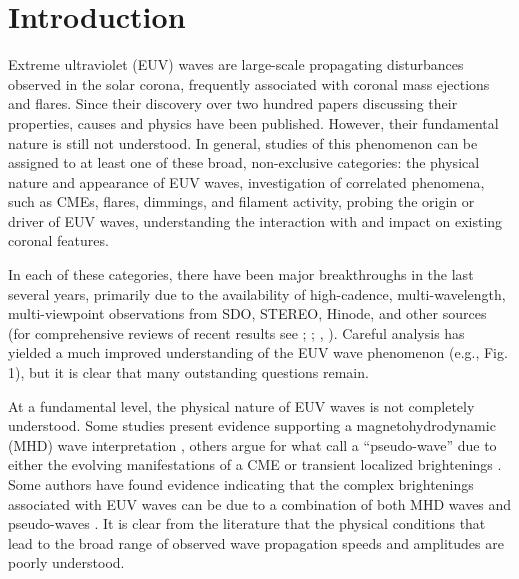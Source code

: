 \section{Introduction}\label{sec:Intro}

Extreme ultraviolet (EUV) waves are large-scale propagating
disturbances observed in the solar corona, frequently associated with
coronal mass ejections and flares.  Since their discovery
\citep{1997SoPh..175..571M, 1998GeoRL..25.2465T, 1999ApJ...517L.151T}
over two hundred papers discussing their properties, causes and
physics have been published.  However, their fundamental nature is
still not understood. In general, studies of this phenomenon can be
assigned to at least one of these broad, non-exclusive categories: the
physical nature and appearance of EUV waves, investigation of
correlated phenomena, such as CMEs, flares, dimmings, and filament
activity, probing the origin or driver of EUV waves, understanding the
interaction with and impact on existing coronal features.

In each of these categories, there have been major breakthroughs in
the last several years, primarily due to the availability of
high-cadence, multi-wavelength, multi-viewpoint observations from SDO,
STEREO, Hinode, and other sources (for comprehensive reviews of recent
results see \cite{2011SSRv..158..365G}; \cite{2011JASTP..73.1096Z};
\cite{2011A&A...532A.151W}, \cite{2012SoPh..281..187P}).  Careful
analysis has yielded a much improved understanding of the EUV wave
phenomenon (e.g., Fig. 1), but it is clear that many outstanding
questions remain.

At a fundamental level, the physical nature of EUV waves is not
completely understood. Some studies present evidence supporting a
magnetohydrodynamic (MHD) wave interpretation
\citep{1998GeoRL..25.2465T, 1999ApJ...517L.151T,2000ApJ...543L..89W,
  2001JGR...10625089W, 2002ApJ...574..440O, 2010ApJ...713.1008S},
others argue for what \cite{2012SoPh..281..187P} call a “pseudo-wave”
due to either the evolving manifestations of a CME
\citep{1999SoPh..190..107D, 2000ApJ...545..512D, 2008SoPh..247..123D,
  2011ApJ...738..167S} or transient localized brightenings
\citep{2007AN....328..760A, 2007ApJ...656L.101A,}.  Some authors have
found evidence indicating that the complex brightenings associated
with EUV waves can be due to a combination of both MHD waves and
pseudo-waves \citep{2002ApJ...572L..99C, 2005ApJ...622.1202C,
  2004A&A...427..705Z, 2009ApJ...705..587C}.  It is clear from the
literature that the physical conditions that lead to the broad range
of observed wave propagation speeds \citep{2011A&A...532A.151W} and
amplitudes are poorly understood.

